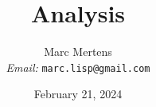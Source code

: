 \documentclass{book}
\newcommand{\tmemail}[1]{\\ \textit{Email:} \texttt{#1}}
\begin{document}
\title{Analysis}

\author{
  Marc Mertens
  \tmemail{marc.lisp@gmail.com}
}

\date{February 21, 2024}

\maketitle

{\tableofcontents}

\

\

\

\

\

\

\printindex
\end{document}
